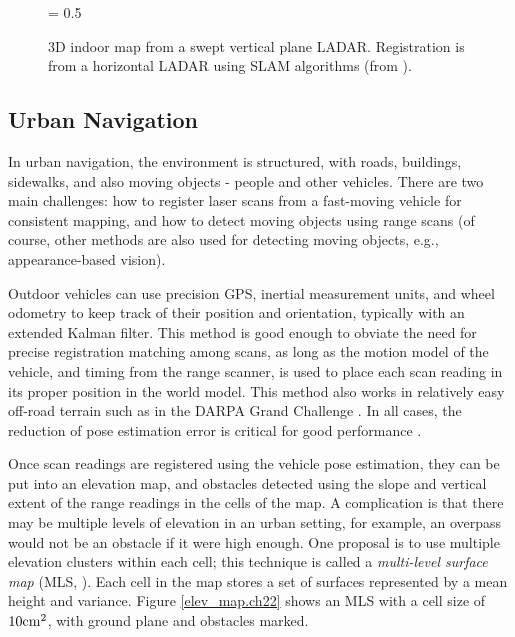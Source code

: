 \documentclass[twocolumn,oneside]{book}
\begin{document}
\begin{figure}[hbt]
{\epsfxsize = 0.5\textwidth {}}
\caption{3D indoor map from a swept vertical plane LADAR.
Registration is from a horizontal LADAR using SLAM algorithms (from
\cite{thrun00}). 
\label{indoor_3d_map.ch22}}
\end{figure}



\subsection{Urban Navigation}

In urban navigation, the environment is structured, with roads,
buildings, sidewalks, and also moving objects - people and other
vehicles.  There are two main challenges: how to register laser scans
from a fast-moving vehicle for consistent mapping, and how to detect
moving objects using range scans (of course, other methods are also
used for detecting moving objects, e.g., appearance-based vision).

Outdoor vehicles can use precision GPS, inertial measurement units,
and wheel odometry to keep track of their position and orientation,
typically with an extended Kalman filter.  This method is good enough
to obviate the need for precise registration matching among scans, as
long as the motion model of the vehicle, and timing from the range
scanner, is used to place each scan reading in its proper position in
the world model.  This method also works in relatively easy off-road
terrain such as in the DARPA Grand Challenge
\cite{GrandChallenge}.  In all cases, the reduction of pose
estimation error is critical for good performance
\cite{thrun06}. 

Once scan readings are registered using the vehicle pose estimation,
they can be put into an elevation map, and obstacles detected using
the slope and vertical extent of the range readings in the cells of
the map.  A complication is that there may be multiple levels of
elevation in an urban setting, for example, an overpass would not be
an obstacle if it were high enough.  One proposal is to use multiple
elevation clusters within each cell; this technique is called a {\em
multi-level surface map } (MLS, \cite{triebel06}).
Each cell in the map stores a set of surfaces represented by a mean
height and variance.  Figure \ref{elev_map.ch22} shows an MLS with a
cell size of $10 {\rm cm}^2$, with ground plane and obstacles marked.
\end{document}
